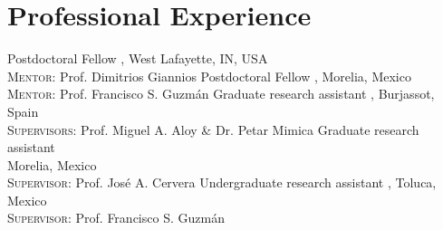 %
\section{Professional Experience}

%
{\DPA}{Postdoctoral Fellow}{}{}%
{\Purdue, West Lafayette, IN, USA\\
  \textsc{Mentor}: Prof. Dimitrios Giannios%
}
%
{\IFMes}{Postdoctoral Fellow}{}{}%
{\UMSNHes, Morelia, Mexico\\
  \textsc{Mentor}: Prof. Francisco S. Guzmán%
}
%
{\DAAval}{Graduate research assistant}{}{}%
{\UVval, Burjassot, Spain\\
  \textsc{Supervisors}: Prof. Miguel A. Aloy \& Dr. Petar Mimica%
}
%
{\IFMes}{Graduate research assistant}{}{}%
{\UMSNHes\\
  Morelia, Mexico\\
  \textsc{Supervisor}: Prof. José A. Cervera%
}
%
{\FCes}{Undergraduate research assistant}{}{}%
{\UAEMes, Toluca, Mexico\\
  \textsc{Supervisor}: Prof. Francisco S. Guzmán%
}



%
%
